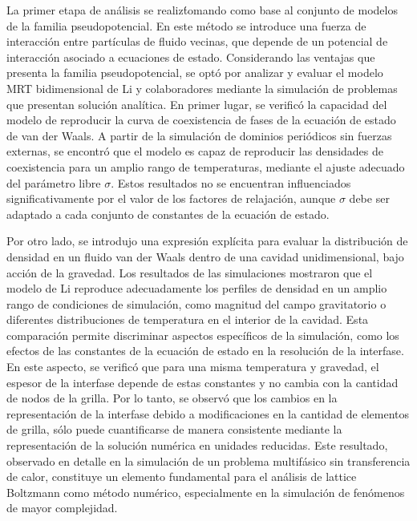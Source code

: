 \bigskip

La primer etapa de an\'alisis se realiz\' tomando como base al conjunto de modelos de la familia pseudopotencial. En este m\'etodo se introduce una fuerza de interacci\'on entre part\'iculas de fluido vecinas, que depende de un potencial de interacci\'on asociado a ecuaciones de estado. Considerando las ventajas que presenta la familia pseudopotencial, se opt\'o por analizar y evaluar el modelo MRT bidimensional de Li y colaboradores mediante la simulaci\'on de problemas que presentan soluci\'on anal\'itica. En primer lugar, se verific\'o la capacidad del modelo de reproducir la curva de coexistencia de fases de la ecuaci\'on de estado de van der Waals. A partir de la simulaci\'on de dominios peri\'odicos sin fuerzas externas, se encontr\'o que el modelo es capaz de reproducir las densidades de coexistencia para un amplio rango de temperaturas, mediante el ajuste adecuado del par\'ametro libre $\sigma$. Estos resultados no se encuentran influenciados significativamente por el valor de los factores de relajaci\'on, aunque $\sigma$ debe ser adaptado a cada conjunto de constantes de la ecuaci\'on de estado.

Por otro lado, se introdujo una expresi\'on expl\'icita para evaluar la distribuci\'on de densidad en un fluido van der Waals dentro de una cavidad unidimensional, bajo acci\'on de la gravedad. Los resultados de las simulaciones mostraron que el modelo de Li reproduce adecuadamente los perfiles de densidad en un amplio rango de condiciones de simulaci\'on, como magnitud del campo gravitatorio o diferentes distribuciones de temperatura en el interior de la cavidad. Esta comparaci\'on permite discriminar aspectos espec\'ificos de la simulaci\'on, como los efectos de las constantes de la ecuaci\'on de estado en la resoluci\'on de la interfase. En este aspecto, se verific\'o que para una misma temperatura y gravedad, el espesor de la interfase depende de estas constantes y no cambia con la cantidad de nodos de la grilla. Por lo tanto, se observ\'o que los cambios en la representaci\'on de la interfase debido a modificaciones en la cantidad de elementos de grilla, s\'olo puede cuantificarse de manera consistente mediante la representaci\'on de la soluci\'on num\'erica en unidades reducidas. Este resultado, observado en detalle en la simulaci\'on de un problema multif\'asico sin transferencia de calor, constituye un elemento fundamental para el an\'alisis de lattice Boltzmann como m\'etodo num\'erico, especialmente en la simulaci\'on de fen\'omenos de mayor complejidad.

